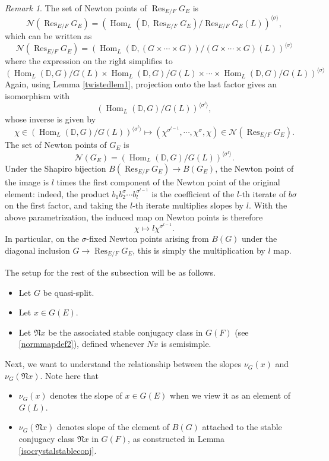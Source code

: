 \documentclass[11pt,a4paper]{article}
\theoremstyle{definition}
\theoremstyle{plain}
\theoremstyle{remark}
\newtheorem{R}[shared]{Remark}
\theoremstyle{plain}
\DeclareMathOperator{\Hom}{Hom}
\DeclareMathOperator{\Res}{Res}
\begin{document}
\begin{R}
    The set of Newton points of $\Res_{E/F}G_E$ is $$\mathcal{N}(\Res_{E/F} G_E) = (\Hom_L(\mathbb{D},\Res_{E/F}G_E)/\Res_{E/F}G_E(L))^{\langle \sigma \rangle},$$ which can be written as $$\mathcal{N}(\Res_{E/F} G_E) =(\Hom_L(\mathbb{D}, (G\times \cdots \times G))/(G \times \cdots \times G)(L))^{\langle \sigma \rangle}$$ where the expression on the right simplifies to $$(\Hom_L(\mathbb{D},G)/G(L) \times \Hom_L(\mathbb{D},G)/G(L) \times \cdots \times \Hom_L(\mathbb{D},G)/G(L))^{\langle \sigma \rangle}$$ Again, using Lemma \ref{twistedlem1}, projection onto the last factor gives an isomorphism with $$(\Hom_L(\mathbb{D}, G)/G(L))^{\langle \sigma^l \rangle},$$ whose inverse is given by $$\chi \in (\Hom_L(\mathbb{D}, G)/G(L))^{\langle \sigma^l \rangle} \mapsto (\chi^{\sigma^{l-1}}, \cdots, \chi^{\sigma}, \chi) \in \mathcal{N}(\Res_{E/F}G_E).$$ The set of Newton points of $G_E$ is $$ \mathcal{N}(G_E) = (\Hom_L(\mathbb{D}, G)/G(L))^{\langle \sigma^l \rangle}.$$ Under the Shapiro bijection $B(\Res_{E/F}G_E) \xrightarrow[]{} B(G_E)$, the Newton point of the image is $l$ times the first component of the Newton point of the original element: indeed, the product $b_1b_2^{\sigma}\cdots b_l^{\sigma^{l-1}}$ is the coefficient of the $l$-th iterate of $b\sigma$ on the first factor, and taking the $l$-th iterate multiplies slopes by $l$. With the above parametrization, the induced map on Newton points is therefore $$\chi \mapsto l\chi^{\sigma^{l-1}}.$$ In particular, on the $\sigma$-fixed Newton points arising from $B(G)$ under the diagonal inclusion $G \xrightarrow[]{} \Res_{E/F}G_E$, this is simply the multiplication by $l$ map.
\end{R}

The setup for the rest of the subsection will be as follows.
\begin{itemize}
    \item Let $G$ be quasi-split.
    \item Let $x \in G(E)$.
    \item Let $\mathfrak{N}x$ be the associated stable conjugacy class in $G(F)$ (see \ref{normmapdef2}), defined whenever $Nx$ is semisimple.
\end{itemize}

Next, we want to understand the relationship between the slopes $\nu_G(x)$ and $\nu_G(\mathfrak{N}x)$. Note here that
\begin{itemize}
    \item $\nu_G(x)$ denotes the slope of $x \in G(E)$ when we view it as an element of $G(L)$.
    \item $\nu_G(\mathfrak{N}x)$ denotes slope of the element of $B(G)$ attached to the stable conjugacy class $\mathfrak{N}x$ in $G(F)$, as constructed in Lemma \ref{isocrystalstableconj}.
\end{itemize}
\end{document}
